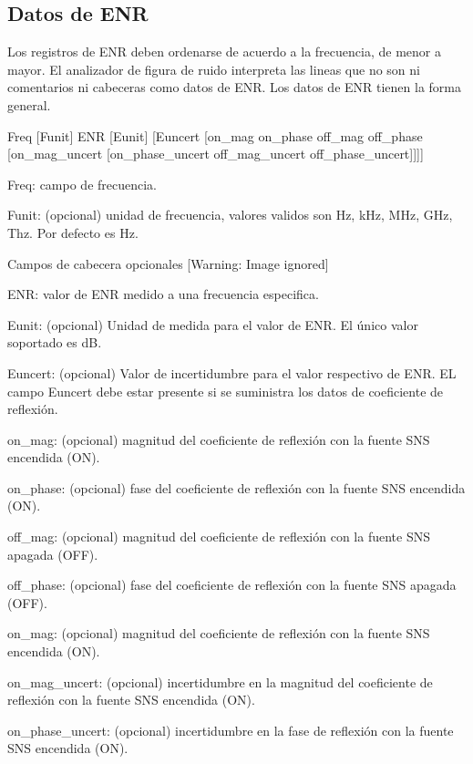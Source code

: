 \documentclass{article}
\begin{document}
\bigskip

\subsection{Datos de ENR}
Los registros de ENR deben ordenarse de acuerdo a la frecuencia, de menor a mayor. El analizador de figura de ruido interpreta las lineas que no son ni comentarios ni cabeceras como datos de ENR. Los datos de ENR tienen la forma general.

Freq [Funit] ENR [Eunit] [Euncert [on\_mag on\_phase off\_mag off\_phase [on\_mag\_uncert [on\_phase\_uncert off\_mag\_uncert off\_phase\_uncert]]]]

Freq: campo de frecuencia.

Funit: (opcional) unidad de frecuencia, valores validos son Hz, kHz, MHz, GHz, Thz. Por defecto es Hz.



\begin{center}
\begin{minipage}{10.61cm}
Campos de cabecera opcionales
 [Warning: Image ignored] %
\end{minipage}
\end{center}
ENR: valor de ENR medido a una frecuencia especifica.

Eunit: (opcional) Unidad de medida para el valor de ENR. El único valor soportado es dB.

Euncert: (opcional) Valor de incertidumbre para el valor respectivo de ENR. EL campo Euncert debe estar presente si se suministra los datos de coeficiente de reflexión.

on\_mag: (opcional) magnitud del coeficiente de reflexión con la fuente SNS encendida (ON).

on\_phase: (opcional) fase del coeficiente de reflexión con la fuente SNS encendida (ON).

off\_mag: (opcional) magnitud del coeficiente de reflexión con la fuente SNS apagada (OFF).

off\_phase: (opcional) fase del coeficiente de reflexión con la fuente SNS apagada (OFF).

on\_mag: (opcional) magnitud del coeficiente de reflexión con la fuente SNS encendida (ON).

on\_mag\_uncert: (opcional) incertidumbre en la magnitud del coeficiente de reflexión con la fuente SNS encendida (ON).

on\_phase\_uncert: (opcional) incertidumbre en la fase de reflexión con la fuente SNS encendida (ON).
\end{document}
